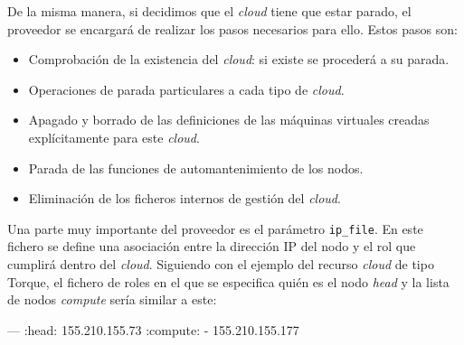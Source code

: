 De la misma manera, si decidimos que el \emph{cloud} tiene que estar parado, el proveedor se encargará de realizar los pasos necesarios para ello. Estos pasos son:

\begin{itemize}
\item Comprobación de la existencia del \emph{cloud}: si existe se procederá a su parada.
\item Operaciones de parada particulares a cada tipo de \emph{cloud}.
\item Apagado y borrado de las definiciones de las máquinas virtuales creadas explícitamente para este \emph{cloud}.
\item Parada de las funciones de automantenimiento de los nodos.
\item Eliminación de los ficheros internos de gestión del \emph{cloud}.
\end{itemize}

Una parte muy importante del proveedor es el parámetro \texttt{ip\_file}. En este fichero se define una asociación entre la dirección IP del nodo y el rol que cumplirá dentro del \emph{cloud}. Siguiendo con el ejemplo del recurso \emph{cloud} de tipo Torque, el fichero de roles en el que se especifica quién es el nodo \emph{head} y la lista de nodos \emph{compute} sería similar a este:

\begin{yamlcode}
--- 
:head: 155.210.155.73
:compute:
- 155.210.155.177
\end{yamlcode}

